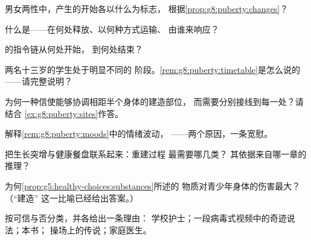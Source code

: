\begin{exercise}[$\star$]\label{exo:g8:puberty:3}
男女两性中，产生的开始各以什么为标志，
根据\cref{prop:g8:puberty:changes}？
\end{exercise}

\begin{exercise}[$\star$]\label{exo:g8:puberty:4}
什么是——在何处释放、以何种方式运输、
由谁来响应？
\end{exercise}

\begin{exercise}[$\star$]\label{exo:g8:puberty:5}
的指令链从何处开始，
到何处结束？
\end{exercise}

\begin{exercise}[$\star$]\label{exo:g8:puberty:6}
两名十三岁的学生处于明显不同的
阶段。\cref{rem:g8:puberty:timetable}是怎么说的
——请完整说明？
\end{exercise}

\begin{exercise}[$\star\star$]\label{exo:g8:puberty:7}
为何一种信使能够协调相距半个身体的建造部位，
而需要分别接线到每一处？请结合
\cref{ex:g8:puberty:sites}作答。
\end{exercise}

\begin{exercise}[$\star\star$]\label{exo:g8:puberty:8}
解释\cref{rem:g8:puberty:moods}中的情绪波动，
——两个原因，一条宽慰。
\end{exercise}

\begin{exercise}[$\star\star$]\label{exo:g8:puberty:9}
把生长突增与健康餐盘联系起来：重建过程
最需要哪几类？
其依据来自哪一章的推理？
\end{exercise}

\begin{exercise}[$\star\star$]\label{exo:g8:puberty:10}
为何\cref{prop:g5:healthy-choices:substances}所述的
物质对青少年身体的伤害最大？（“建造”
这一比喻已经给出答案。）
\end{exercise}

\begin{exercise}[$\star\star$]\label{exo:g8:puberty:11}
按可信与否分类，并各给出一条理由：
学校护士；一段病毒式视频中的奇迹说法；本书；
操场上的传说；家庭医生。
\end{exercise}

